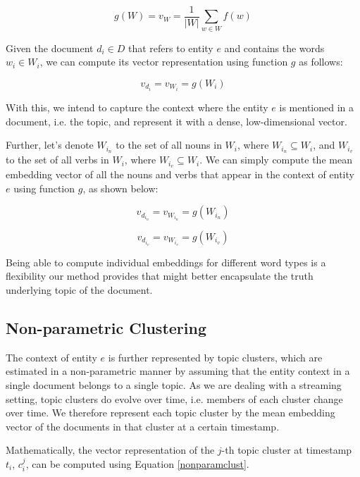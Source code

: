 \documentclass{article}
\begin{document}
\begin{equation}
\label{wordembedding}
g(W) = v_W = \frac{1}{|W|} \sum_{w \in W}{f(w)}
\end{equation}

Given the document $d_i \in D$ that refers to entity $e$ and contains the words $w_i \in W_i$, we can compute its vector representation using function $g$ as follows:

\begin{equation}
\label{wordembedding1}
v_{d_i} = v_{W_i} = g(W_i)
\end{equation}

With this, we intend to capture the context where the entity $e$ is mentioned in a document, i.e. the topic, and represent it with a dense, low-dimensional vector.

Further, let's denote $W_{i_n}$ to the set of all nouns in $W_i$, where $W_{i_n} \subseteq W_i$, and $W_{i_v}$ to the set of all verbs in $W_i$, where $W_{i_v} \subseteq W_i$. We can simply compute the mean embedding vector of all the nouns and verbs that appear in the context of entity $e$ using function $g$, as shown below:

\begin{equation*}
\label{nouns}
v_{d_{i_n}} = v_{W_{i_n}} = g(W_{i_n})
\end{equation*}

\begin{equation*}
\label{verbs}
v_{d_{i_v}} = v_{W_{i_v}} = g(W_{i_v})
\end{equation*}

Being able to compute individual embeddings for different word types is a flexibility our method provides that might better encapsulate the truth underlying topic of the document.

\subsection{Non-parametric Clustering}
\label{non}

The context of entity $e$ is further represented by topic clusters, which are estimated in a non-parametric manner by assuming that the entity context in a single document belongs to a single topic. As we are dealing with a streaming setting, topic clusters do evolve over time, i.e. members of each cluster change over time. We therefore represent each topic cluster by the mean embedding vector of the documents in that cluster at a certain timestamp.

Mathematically, the vector representation of the $j$-th topic cluster at timestamp $t_i$, $c^j_i$, can be computed using Equation \ref{nonparamclust}.
\end{document}
